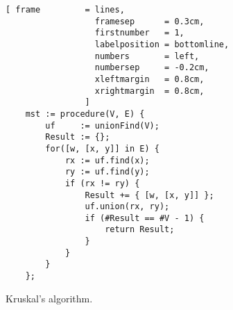 \begin{figure}[!ht]
\centering
\begin{Verbatim}[ frame         = lines, 
                  framesep      = 0.3cm, 
                  firstnumber   = 1,
                  labelposition = bottomline,
                  numbers       = left,
                  numbersep     = -0.2cm,
                  xleftmargin   = 0.8cm,
                  xrightmargin  = 0.8cm,
                ]
    mst := procedure(V, E) {
        uf     := unionFind(V);
        Result := {};
        for([w, [x, y]] in E) {
            rx := uf.find(x);
            ry := uf.find(y);
            if (rx != ry) {
                Result += { [w, [x, y]] };
                uf.union(rx, ry);
                if (#Result == #V - 1) {
                    return Result;
                }
            }
        }        
    };
\end{Verbatim}
\vspace*{-0.3cm}
\caption{Kruskal's algorithm.}
\label{fig:kruskal.stlx}
\end{figure}


